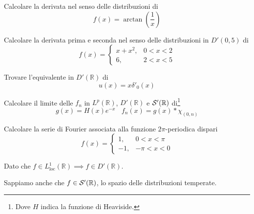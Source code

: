 Calcolare la derivata nel senso delle distribuzioni di
\begin{equation*}
f(x)=\arctan\left(\frac{1}{x}\right)
\end{equation*}
\Esercizio{}

Calcolare la derivata prima e seconda nel senso delle distribuzioni in $D'( 0,5)$ di
\begin{equation*}
f(x)=\begin{cases}
x+x^{2} , & 0< x< 2\\
6, & 2< x< 5
\end{cases}
\end{equation*}
\Esercizio{}

Trovare l'equivalente in $D'(\mathbb{R} )$ di
\begin{equation*}
u(x)=x\delta '_{0} (x)
\end{equation*}
\Esercizio{}

Calcolare il limite delle $f_{n}$ in $L^{p} (\mathbb{R} )$, $D'(\mathbb{R} )$ e $\mathcal{S}  '(\mathbb{R} )$ di\footnote{Dove $H$ indica la funzione di Heaviside.}
\begin{equation*}
g(x)=H(x)e^{-x} \ \ \ \ f_{n} (x)=g(x)*\chi _{(0,n)}
\end{equation*}
\Esercizio{}

Calcolare la serie di Fourier associata alla funzione $2\pi $-periodica dispari
\begin{equation*}
f(x)=\begin{cases}
1, & 0< x< \pi \\
-1, & -\pi < x< 0
\end{cases}
\end{equation*}
\ParteSoluzioni
\Soluzione

Dato che $f\in L^{1}_{\mathrm{loc}} (\mathbb{R} )\implies f\in D'(\mathbb{R} )$.

Sappiamo anche che $f\in \mathcal{S}  '(\mathbb{R})$, lo spazio delle distribuzioni temperate.


